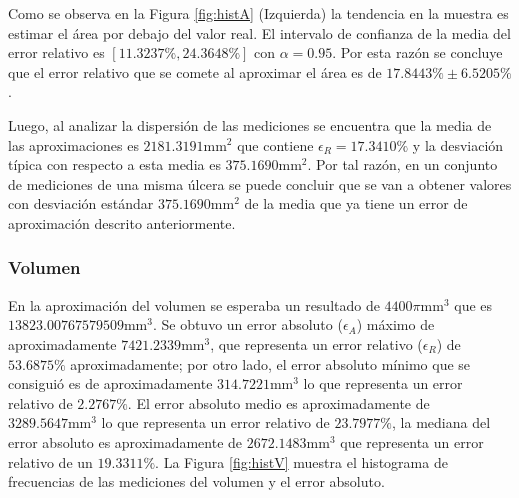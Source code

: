 Como se observa en la Figura \ref{fig:histA} (Izquierda) la tendencia en la muestra es estimar el área por debajo del valor real. El intervalo de confianza de la media del error relativo es $[11.3237\%, 24.3648\%]$ con $\alpha =0.95$. Por esta razón se concluye que el error relativo que se comete al aproximar el área es de $17.8443\% \pm 6.5205\%$. 

Luego, al analizar la dispersión de las mediciones se encuentra que la media de las aproximaciones es $2181.3191\text{mm}^2$ que contiene $\epsilon_R=17.3410\%$ y la desviación típica con respecto a esta media es $375.1690\text{mm}^2$. Por tal razón, en un conjunto de mediciones de una misma úlcera se puede concluir que se van a obtener valores con desviación estándar $375.1690\text{mm}^2$ de la media que ya tiene un error de aproximación descrito anteriormente.

\subsubsection{Volumen}

En la aproximación del volumen se esperaba un resultado de $4400\pi\text{mm}^3$ que es $13823.00767579509\text{mm}^3$. Se obtuvo un error absoluto ($\epsilon_A$) máximo de aproximadamente $7421.2339\text{mm}^3$, que representa un error relativo ($\epsilon_R$) de $53.6875\%$ aproximadamente; por otro lado, el error absoluto mínimo que se consiguió es de aproximadamente $314.7221\text{mm}^3$ lo que representa un error relativo de $2.2767\%$. El error absoluto medio es aproximadamente de $3289.5647\text{mm}^3$ lo que representa un error relativo de $23.7977\%$, la mediana del error absoluto es aproximadamente de $2672.1483\text{mm}^3$ que representa un error relativo de un $19.3311\%$. La Figura \ref{fig:histV} muestra el histograma de frecuencias de las mediciones del volumen y el error absoluto.

